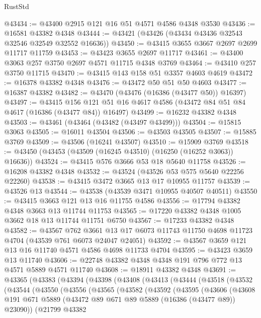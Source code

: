 \begin{lexlean}{RustStd}
\begin{coremodule}
@43434 := @43400 @2915 @121 @16 @51 @4571 @4586 @4348 @3530
@43436 := @16581 @43382 @4348
@43444 := @43421 (@43426 (@43434 @43436 @32543 @32546 @32549 @32552 @16636))
@43450 := @43415 @3655 @3667 @2697 @2699 @11717 @11759
@43453 := @43423 @3655 @2697 @11717
@43461 := @43400 @3063 @257 @3750 @2697 @4571 @11715 @4348 @3769
@43464 := @43410 @257 @3750 @11715
@43470 := @43415 @143 @158 @51 @3357 @4603 @4619
@43472 := @16378 @43382 @4348
@43476 := @43472 @50 @51 @50 @4603
@43477 := @16387 @43382
@43482 := @43470 (@43476 (@16386 (@43477 @50)) @16397)
@43497 := @43415
    @156
    @121
    @51
    @16
    @4617
    @4586
    (@43472 @84 @51 @84 @4617 (@16386 (@43477 @84)) @16497)
@43499 := @16232 @43382 @4348
@43503 := @43461 (@43464 (@43482 (@43497 @43499)))
@43504 := @15815 @3063
@43505 := @16011 @43504
@43506 := @43503 @43505
@43507 := @15885 @3769
@43509 := @43506 (@16241 @43507)
@43510 := @15909 @3769
@43518 := @43450 (@43453 (@43509 (@16245 @43510) (@16250 (@16252 @3063)) @16636))
@43524 := @43415 @576 @3666 @53 @18 @5640 @11758
@43526 := @16208 @43382 @4348
@43532 := @43524 (@43526 @53 @575 @5640 @22256 @22260)
@43538 := @43415 @3472 @3665 @13 @17 @10955 @11757
@43539 := @43526 @13
@43544 := @43538 (@43539 @3471 @10955 @40507 @40511)
@43550 := @43415 @3663 @121 @13 @16 @11755 @4586
@43556 := @17794 @43382 @4348 @3663 @13 @11744 @11753
@43565 := @17220 @43382 @4348 @1005 @3662 @18 @13 @11744 @11751 @6750
@43567 := @17233 @43382 @4348
@43582 := @43567
    @762
    @3661
    @13
    @17
    @6073
    @11743
    @11750
    @4698
    @11723
    @4704
    (@43539 @761 @6073 @24047 @24051)
@43592 := @43567 @3659 @121 @13 @16 @11740 @4571 @4586 @4698 @11733 @4704
@43595 := @43423 @3659 @13 @11740
@43606 := @22748 @43382 @4348 @4348 @191 @796 @772 @13 @4571 @5889 @4571 @11740
@43608 := @18911 @43382 @4348
@43691 := @43365
    (@43383
      (@43394
        (@43398
          (@43408
            (@43413
              (@43444
                (@43518
                  (@43532
                    (@43544
                      (@43550
                        (@43556
                          (@43565
                            (@43582
                              (@43592
                                (@43595
                                  (@43606
                                    (@43608
                                      @191
                                      @671
                                      @5889
                                      (@43472 @89 @671 @89 @5889 (@16386 (@43477 @89)) @23090))
                                    (@21799
                                      @43382

\end{coremodule}
\end{lexlean}
